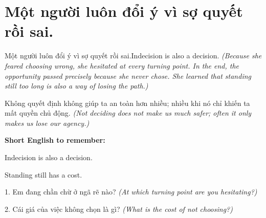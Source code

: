 \section{Một người luôn đổi ý vì sợ quyết rồi sai.}
\begin{truyen}{Một người luôn đổi ý vì sợ quyết rồi sai.}{Indecision is also a decision.}
\textit{(Because she feared choosing wrong, she hesitated at every turning point. In the end, the opportunity passed precisely because she never chose. She learned that standing still too long is also a way of losing the path.)}
\end{truyen}
\begin{baihoc}
Không quyết định không giúp ta an toàn hơn nhiều; nhiều khi nó chỉ khiến ta mất quyền chủ động.
\textit{(Not deciding does not make us much safer; often it only makes us lose our agency.)}
\end{baihoc}
\begin{ghinhoanh}
\textbf{Short English to remember:}

Indecision is also a decision.

Standing still has a cost.
\end{ghinhoanh}
\begin{tuhocnhanh}
1. Em đang chần chừ ở ngã rẽ nào? \textit{(At which turning point are you hesitating?)}

2. Cái giá của việc không chọn là gì? \textit{(What is the cost of not choosing?)}
\end{tuhocnhanh}
\ngancach

